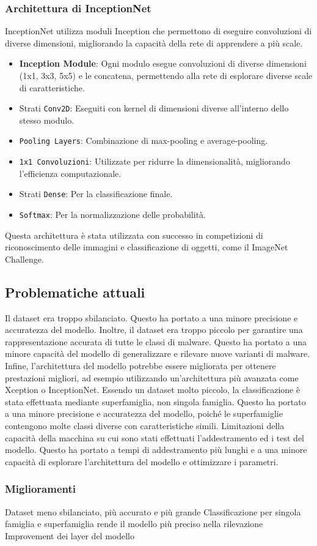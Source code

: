 \subsubsection{Architettura di InceptionNet}
InceptionNet utilizza moduli Inception che permettono di eseguire convoluzioni di diverse dimensioni, migliorando la capacità della rete di apprendere a più scale.
\begin{itemize}
    \item \textbf{Inception Module}: Ogni modulo esegue convoluzioni di diverse dimensioni (1x1, 3x3, 5x5) e le concatena, permettendo alla rete di esplorare diverse scale di caratteristiche.
    \item Strati \texttt{Conv2D}: Eseguiti con kernel di dimensioni diverse all'interno dello stesso modulo.
    \item \texttt{Pooling Layers}: Combinazione di max-pooling e average-pooling.
    \item \texttt{1x1 Convoluzioni}: Utilizzate per ridurre la dimensionalità, migliorando l'efficienza computazionale.
    \item Strati \texttt{Dense}: Per la classificazione finale.
    \item \texttt{Softmax}: Per la normalizzazione delle probabilità.
\end{itemize}
Questa architettura è stata utilizzata con successo in competizioni di riconoscimento delle immagini e classificazione di oggetti, come il ImageNet Challenge.

\subsection{Problematiche attuali}
\label{Problema}
Il dataset era troppo sbilanciato. Questo ha portato a una minore precisione e accuratezza del modello. Inoltre, il dataset era troppo piccolo per garantire una rappresentazione accurata di tutte le classi di malware. Questo ha portato a una minore capacità del modello di generalizzare e rilevare nuove varianti di malware. Infine, l'architettura del modello potrebbe essere migliorata per ottenere prestazioni migliori, ad esempio utilizzando un'architettura più avanzata come Xception o InceptionNet.
Essendo un dataset molto piccolo, la classificazione è stata effettuata mediante superfamiglia, non singola famiglia. Questo ha portato a una minore precisione e accuratezza del modello, poiché le superfamiglie contengono molte classi diverse con caratteristiche simili.
Limitazioni della capacità della macchina su cui sono stati effettuati l'addestramento ed i test del modello. Questo ha portato a tempi di addestramento più lunghi e a una minore capacità di esplorare l'architettura del modello e ottimizzare i parametri.

\subsubsection{Miglioramenti}
Dataset meno sbilanciato, più accurato e più grande
Classificazione per singola famiglia e superfamiglia rende il modello più preciso nella rilevazione
Improvement dei layer del modello
